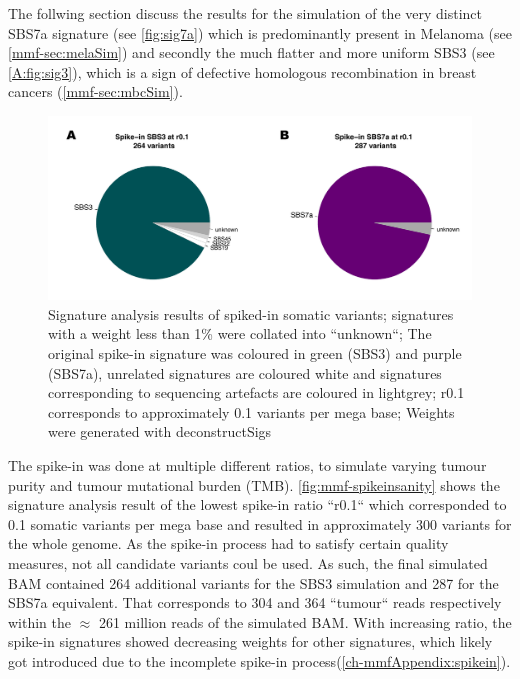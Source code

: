 The follwing section discuss the results for the simulation of the very distinct SBS7a signature (see \autoref{fig:sig7a}) which is predominantly present in Melanoma (see \autoref{mmf-sec:melaSim}) and secondly the much flatter and more uniform SBS3 (see \autoref{A:fig:sig3}), which is a sign of defective homologous recombination in breast cancers (\autoref{mmf-sec:mbcSim}). 


\begin{figure}[ht]
\centering
\includegraphics[width=.9\linewidth]{Figures/MisMatchFinder/spikeInSanityCheck.pdf}
\caption[Signature analysis of spike-in somatic variants]{Signature analysis results of spiked-in somatic variants; signatures with a weight less than 1\% were collated into ``unknown``; The original spike-in signature was coloured in green (SBS3) and purple (SBS7a), unrelated signatures are coloured white and signatures corresponding to sequencing artefacts are coloured in lightgrey; r0.1 corresponds to approximately 0.1 variants per mega base; Weights were generated with deconstructSigs \cite{Rosenthal2016} }\label{fig:mmf-spikeinsanity}
\end{figure}

The spike-in was done at multiple different ratios, to simulate varying tumour purity and tumour mutational burden (TMB). \autoref{fig:mmf-spikeinsanity} shows the signature analysis result of the lowest spike-in ratio ``r0.1`` which corresponded to 0.1 somatic variants per mega base and resulted in approximately 300 variants for the whole genome. As the spike-in process had to satisfy certain quality measures, not all candidate variants coul be used. As such, the final simulated BAM contained 264 additional variants for the SBS3 simulation and 287 for the SBS7a equivalent. That corresponds to 304 and 364 ``tumour`` reads respectively within the $\approx$ 261 million reads of the simulated BAM. With increasing ratio, the spike-in signatures showed decreasing weights for other signatures, which likely got introduced due to the incomplete spike-in process(\autoref{ch-mmfAppendix:spikein}).


